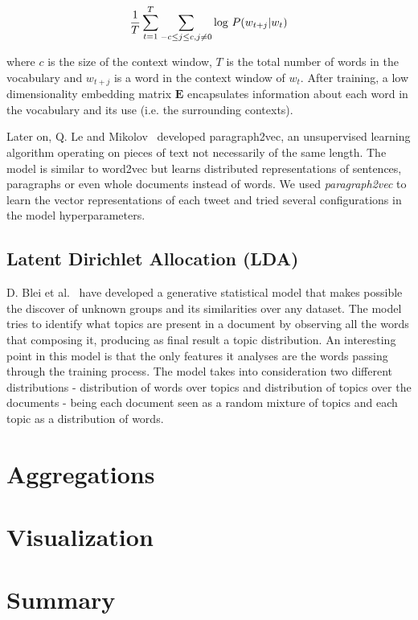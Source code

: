 \begin{equation}
\frac{1}{T}  \sum_{t=1}^{T}  \sum_{-c \leq j \leq  c, j \neq 0} \textnormal{log } P(w_{t+j} | w_t)
\end{equation}

where $c$ is the size of the context window, $T$ is the total number of words in the vocabulary and $w_{t+j}$ is a word in the context window of $w_t$. After training, a low dimensionality embedding matrix $\textbf{E}$ encapsulates information about each word in the vocabulary and its use (i.e. the surrounding contexts).

Later on, Q. Le and Mikolov~\cite{le2014distributed} developed paragraph2vec, an unsupervised learning algorithm operating on pieces of text not necessarily of the same length. The model is similar to word2vec but learns distributed representations of sentences, paragraphs or even whole documents instead of words. We used \emph{paragraph2vec} to learn the vector representations of each tweet and tried several configurations in the model hyperparameters.

\subsection{Latent Dirichlet Allocation (LDA)}
D. Blei et al.~\cite{blei2003latent} have developed a generative statistical model that makes possible the discover of unknown groups and its similarities over any dataset. The model tries to identify what topics are present in a document by observing all the words that composing it, producing as final result a topic distribution. An interesting point in this model is that the only features it analyses are the words passing through the training process. The model takes into consideration two different distributions - distribution of words over topics and distribution of topics over the documents - being each document seen as a random mixture of topics and each topic as a distribution of words.

\section{Aggregations}\label{sec:aggreagations}

\section{Visualization}\label{sec:visualization}

\section{Summary}